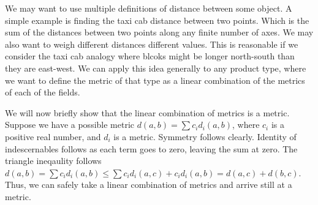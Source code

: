 We may want to use multiple definitions of distance between some object.
A simple example is finding the taxi cab distance between two points.
Which is the sum of the distances between two points along any finite number of axes.
We may also want to weigh different distances different values.
This is reasonable if we consider the taxi cab analogy where blcoks might be longer north-south 
than they are east-west.
We can apply this idea generally to any product type,
where we want to define the metric of that type as a linear combination of the metrics of each of the fields.

We will now briefly show that the linear combination of metrics is a metric.
Suppose we have a possible metric $d(a, b) = \sum c_id_i(a, b)$, 
where $c_i$ is a positive real number, and $d_i$ is a metric.
Symmetry follows clearly.
Identity of indescernables follows as each term goes to zero, leaving the sum at zero.
The triangle ineqaulity follows $d(a, b) = \sum c_id_i(a, b) \le \sum c_id_i(a, c)+c_id_i(a, b) = d(a, c) + d(b, c)$.
Thus, we can safely take a linear combination of metrics and arrive still at a metric.